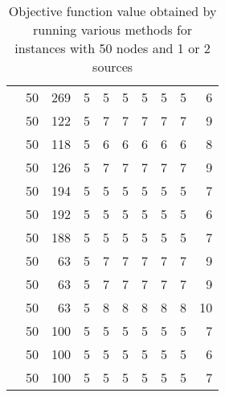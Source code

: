 \begin{table}[]
\begin{tabular}{rrrrrrrrrr}
                    & 50  & 269   & 5  & 5       & 5       & 5       & 5       & 5       & 6     \\
                    & 50  & 122   & 5  & 7       & 7       & 7       & 7       & 7       & 9     \\
                    & 50  & 118   & 5  & 6       & 6       & 6       & 6       & 6       & 8     \\
                    & 50  & 126   & 5  & 7       & 7       & 7       & 7       & 7       & 9     \\
                    & 50  & 194   & 5  & 5       & 5       & 5       & 5       & 5       & 7     \\
                    & 50  & 192   & 5  & 5       & 5       & 5       & 5       & 5       & 6     \\
                    & 50  & 188   & 5  & 5       & 5       & 5       & 5       & 5       & 7     \\
                    & 50  & 63    & 5  & 7       & 7       & 7       & 7       & 7       & 9     \\
                    & 50  & 63    & 5  & 7       & 7       & 7       & 7       & 7       & 9     \\
                    & 50  & 63    & 5  & 8       & 8       & 8       & 8       & 8       & 10    \\
                    & 50  & 100   & 5  & 5       & 5       & 5       & 5       & 5       & 7     \\
                    & 50  & 100   & 5  & 5       & 5       & 5       & 5       & 5       & 6     \\
                    & 50  & 100   & 5  & 5       & 5       & 5       & 5       & 5       & 7    
\end{tabular}
\caption{Objective function value obtained by running various methods for instances with 50 nodes and 1 or 2 sources}
\label{tab:obj:50}
\end{table}
